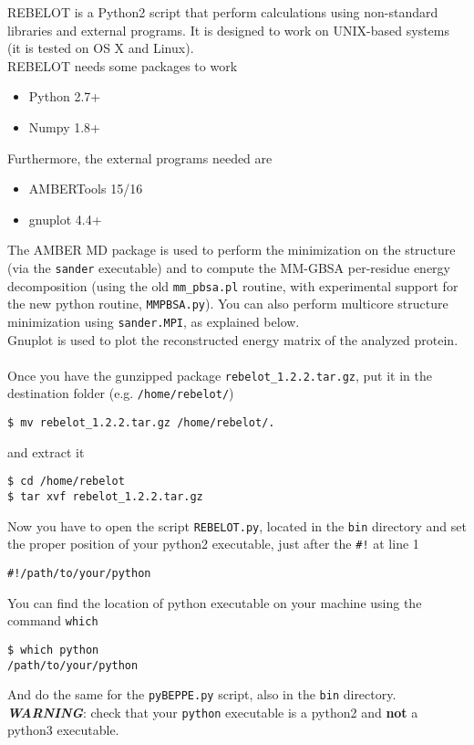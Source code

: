 \documentclass[a4paper,12pt]{book}
\begin{document}
REBELOT is a Python2 script that perform calculations using non-standard libraries and external programs. It is designed to work on UNIX-based systems (it is tested on OS X and Linux).\\
REBELOT needs some packages to work
\begin{itemize}
	\item Python 2.7+
	\item Numpy 1.8+
\end{itemize}
Furthermore, the external programs needed are
\begin{itemize}
	\item AMBERTools 15/16
	\item gnuplot 4.4+ 
\end{itemize}
The AMBER MD package is used to perform the minimization on the structure (via the \texttt{sander} executable) and to compute the MM-GBSA per-residue energy decomposition (using the old \texttt{mm\_pbsa.pl} routine, with experimental support for the new python routine, \texttt{MMPBSA.py}). You can also perform multicore structure minimization using \texttt{sander.MPI}, as explained below.   \\
Gnuplot is used to plot the reconstructed energy matrix of the analyzed protein. \\ \\
Once you have the gunzipped package \texttt{rebelot\_1.2.2.tar.gz}, put it in the destination folder (e.g. \texttt{/home/rebelot/}) 
\begin{lstlisting}
$ mv rebelot_1.2.2.tar.gz /home/rebelot/.
\end{lstlisting}
and extract it
\begin{lstlisting}
$ cd /home/rebelot
$ tar xvf rebelot_1.2.2.tar.gz
\end{lstlisting}
Now you have to open the script \texttt{REBELOT.py}, located in the \texttt{bin} directory and set the proper position of your python2 executable, just after the \texttt{\#!} at line 1
\begin{lstlisting}
#!/path/to/your/python
\end{lstlisting}
You can find the location of python executable on your machine using the command \texttt{which}
\begin{lstlisting}
$ which python
/path/to/your/python
\end{lstlisting}
And do the same for the \texttt{pyBEPPE.py} script, also in the \texttt{bin} directory.\\
\textit{\textbf{WARNING}}: check that your \texttt{python} executable is a python2 and \textbf{not} a python3 executable. \\
\end{document}
